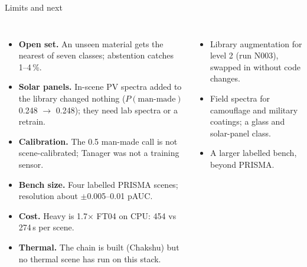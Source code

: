 \documentclass[aspectratio=169,10pt]{beamer}
\begin{document}
\begin{frame}{Limits and next}
\begin{columns}[T,onlytextwidth]
\par
\begin{itemize}\setlength{\itemsep}{0.8mm}\small
\item \textbf{Open set.} An unseen material gets the nearest of seven classes; abstention catches 1--4\,\%.
\item \textbf{Solar panels.} In-scene PV spectra added to the library changed nothing ($P(\text{man-made})$ 0.248 $\to$ 0.248); they need lab spectra or a retrain.
\item \textbf{Calibration.} The 0.5 man-made call is not scene-calibrated; Tanager was not a training sensor.
\item \textbf{Bench size.} Four labelled PRISMA scenes; resolution about $\pm$0.005--0.01 pAUC.
\item \textbf{Cost.} Heavy is 1.7$\times$ FT04 on CPU: 454 vs 274\,s per scene.
\item \textbf{Thermal.} The chain is built (Chakshu) but no thermal scene has run on this stack.
\end{itemize}
\par
\begin{itemize}\setlength{\itemsep}{0.8mm}\small
\item Library augmentation for level 2 (run N003), swapped in without code changes.
\item Field spectra for camouflage and military coatings; a glass and solar-panel class.
\item A larger labelled bench, beyond PRISMA.
\end{itemize}
\end{columns}
\end{frame}
\end{document}
